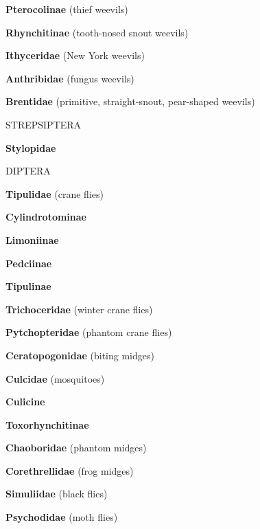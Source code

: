 \documentclass[letterpaper,10pt]{article}
\begin{document}
{\makebox[0.8cm]{}  \textbf{Pterocolinae} (thief weevils) \par
\makebox[0.8cm]{}  \textbf{Rhynchitinae} (tooth-nosed snout weevils) \par
\makebox[0.6cm]{}  \textbf{Ithyceridae} (New York weevils) \par
\makebox[0.6cm]{}  \textbf{Anthribidae} (fungus weevils) \par
\makebox[0.6cm]{}  \textbf{Brentidae} (primitive, straight-snout, pear-shaped weevils) \par
%
%
%
\makebox[0.0cm]{}  STREPSIPTERA \par
\makebox[0.6cm]{}  \textbf{Stylopidae} \par
%
%
%
\makebox[0.0cm]{}  DIPTERA \par
\makebox[0.6cm]{}  \textbf{Tipulidae} (crane flies) \par
\makebox[0.8cm]{}  \textbf{Cylindrotominae} \par
\makebox[0.8cm]{}  \textbf{Limoniinae} \par
\makebox[0.8cm]{}  \textbf{Pedciinae} \par
\makebox[0.8cm]{}  \textbf{Tipulinae} \par
\makebox[0.6cm]{}  \textbf{Trichoceridae} (winter crane flies) \par
\makebox[0.6cm]{}  \textbf{Pytchopteridae} (phantom crane flies) \par
\makebox[0.6cm]{}  \textbf{Ceratopogonidae} (biting midges) \par
\makebox[0.6cm]{}  \textbf{Culcidae} (mosquitoes) \par
\makebox[0.8cm]{}  \textbf{Culicine} \par
\makebox[0.8cm]{}  \textbf{Toxorhynchitinae} \par
\makebox[0.6cm]{}  \textbf{Chaoboridae} (phantom midges) \par
\makebox[0.6cm]{}  \textbf{Corethrellidae} (frog midges) \par
\makebox[0.6cm]{}  \textbf{Simuliidae} (black flies) \par
\makebox[0.6cm]{}  \textbf{Psychodidae} (moth flies) \par
}
\end{document}
